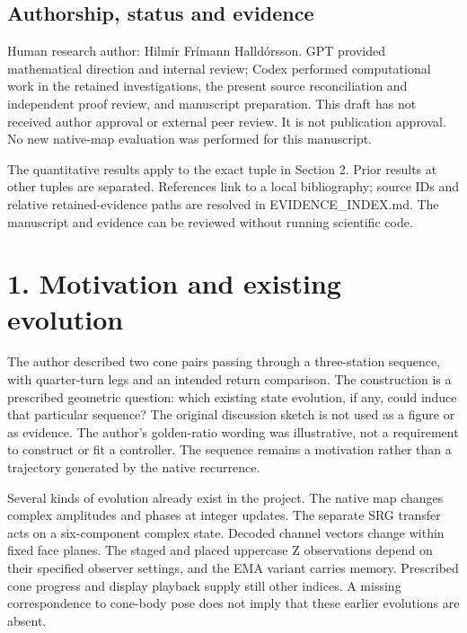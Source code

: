 \documentclass[11pt,a4paper]{article}
\begin{document}
\subsection*{Authorship, status and evidence}
Human research author: Hilmir Frímann Halldórsson. GPT provided mathematical direction and internal review; Codex performed computational work in the retained investigations, the present source reconciliation and independent proof review, and manuscript preparation. This draft has not received author approval or external peer review. It is not publication approval. No new native-map evaluation was performed for this manuscript.

The quantitative results apply to the exact tuple in Section 2. Prior results at other tuples are separated. References link to a local bibliography; source IDs and relative retained-evidence paths are resolved in EVIDENCE\_INDEX.md. The manuscript and evidence can be reviewed without running scientific code.

\clearpage
\section*{1. Motivation and existing evolution}
The author described two cone pairs passing through a three-station sequence, with quarter-turn legs and an intended return comparison. The construction is a prescribed geometric question: which existing state evolution, if any, could induce that particular sequence? The original discussion sketch is not used as a figure or as evidence. The author’s golden-ratio wording was illustrative, not a requirement to construct or fit a controller. The sequence remains a motivation rather than a trajectory generated by the native recurrence. \cite{D01} \cite{D02}

Several kinds of evolution already exist in the project. The native map changes complex amplitudes and phases at integer updates. The separate SRG transfer acts on a six-component complex state. Decoded channel vectors change within fixed face planes. The staged and placed uppercase Z observations depend on their specified observer settings, and the EMA variant carries memory. Prescribed cone progress and display playback supply still other indices. A missing correspondence to cone-body pose does not imply that these earlier evolutions are absent. \cite{DYN} \cite{OBS} \cite{Z} \cite{BRIDGE}
\end{document}
